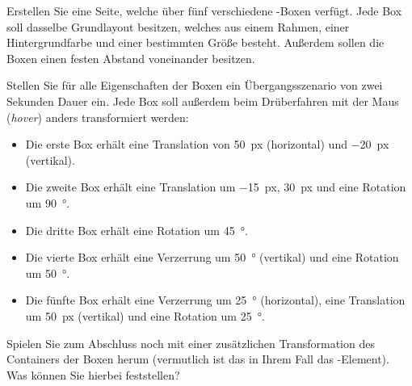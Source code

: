 %
\par Erstellen Sie eine Seite, welche über fünf verschiedene -Boxen
verfügt. Jede Box soll dasselbe Grundlayout besitzen, welches aus einem
Rahmen, einer Hintergrundfarbe und einer bestimmten Größe besteht. Außerdem
sollen die Boxen einen festen Abstand voneinander besitzen.
%
\par Stellen Sie für alle Eigenschaften der Boxen ein Übergangsszenario von
zwei Sekunden Dauer ein. Jede Box soll außerdem beim Drüberfahren mit der Maus
(\emph{hover}) anders transformiert werden:
%
\begin{itemize}
\item
Die erste Box erhält eine Translation von \qty{50}{px} (horizontal) und
\qty{-20}{px} (vertikal).
\item
Die zweite Box erhält eine Translation um \qty{-15}{px}, \qty{30}{px} und eine
Rotation um \qty{90}{\degree}.
\item
Die dritte Box erhält eine Rotation um \qty{45}{\degree}.
\item
Die vierte Box erhält eine Verzerrung um \qty{50}{\degree} (vertikal) und eine
Rotation um \qty{50}{\degree}.
\item
Die fünfte Box erhält eine Verzerrung um \qty{25}{\degree} (horizontal), eine
Translation um \qty{50}{px} (vertikal) und eine Rotation um \qty{25}{\degree}.
\end{itemize}
%
\par Spielen Sie zum Abschluss noch mit einer zusätzlichen Transformation des
Containers der Boxen herum (vermutlich ist das in Ihrem Fall das
-Element). Was können Sie hierbei feststellen?
